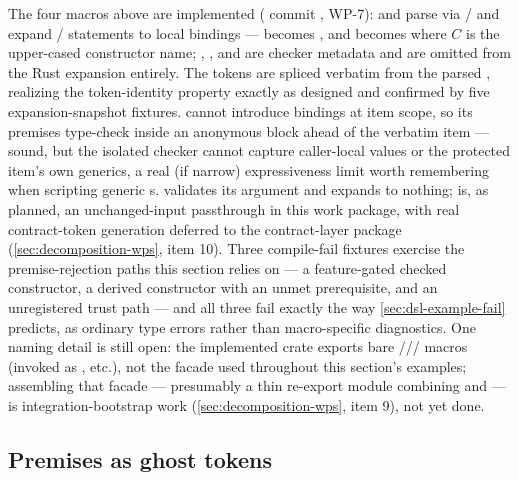 The four macros above are implemented ( commit
, WP-7):  and  parse via
/
and expand / statements to local bindings ---
 becomes , and
 becomes  where $C$ is
the upper-cased constructor name; , , and
 are checker metadata and are omitted from the Rust
expansion entirely. The  tokens are spliced verbatim from
the parsed , realizing the token-identity property
exactly as designed and confirmed by five expansion-snapshot fixtures.
 cannot introduce bindings at item scope, so its
premises type-check inside an anonymous  block ahead of the verbatim 
item --- sound, but the isolated checker cannot capture caller-local
values or the protected item's own generics, a real (if narrow)
expressiveness limit worth remembering when scripting generic
s.  validates its 
argument and expands to nothing;  is, as planned, an
unchanged-input passthrough in this work package, with real
contract-token generation deferred to the contract-layer package
(\cref{sec:decomposition-wps}, item 10). Three compile-fail fixtures
exercise the premise-rejection paths this section relies on --- a
feature-gated checked constructor, a derived constructor with an
unmet prerequisite, and an unregistered trust path --- and all three
fail exactly the way \cref{sec:dsl-example-fail} predicts, as ordinary
 type errors rather than macro-specific diagnostics. One
naming detail is still open: the implemented crate exports bare
/// macros
(invoked as , etc.), not the 
facade used throughout this section's examples; assembling that facade
--- presumably a thin re-export module combining  and
 --- is integration-bootstrap work
(\cref{sec:decomposition-wps}, item 9), not yet done.

\subsection{Premises as ghost tokens}
\label{sec:dsl-tokens}

